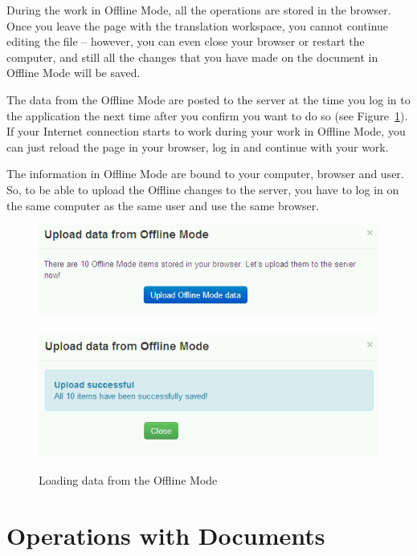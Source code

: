 During the work in Offline Mode, all the operations are stored in the browser. Once you leave the page with the translation workspace, you cannot continue editing the file -- however, you can even close your browser or restart the computer, and still all the changes that you have made on the document in Offline Mode will be saved.

The data from the Offline Mode are posted to the server at the time you log in to the application the next time after you confirm you want to do so (see Figure~\ref{fig:offline_loading}). If your Internet connection starts to work during your work in Offline Mode, you can just reload the page in your browser, log in and continue with your work.

The information in Offline Mode are bound to your computer, browser and user. So, to be able to upload the Offline changes to the server, you have to log in on the same computer as the same user and use the same browser.

\begin{figure}[h]
\begin{center}
\includegraphics[scale=0.4]{figures/user_manual/upload_offline_mode.png}~~~~
\includegraphics[scale=0.4]{figures/user_manual/upload_offline_mode_success.png}
\end{center}
\caption{Loading data from the Offline Mode}
\label{fig:offline_loading}
\end{figure}

\section{Operations with Documents}
\label{um:sec:docoperations}

